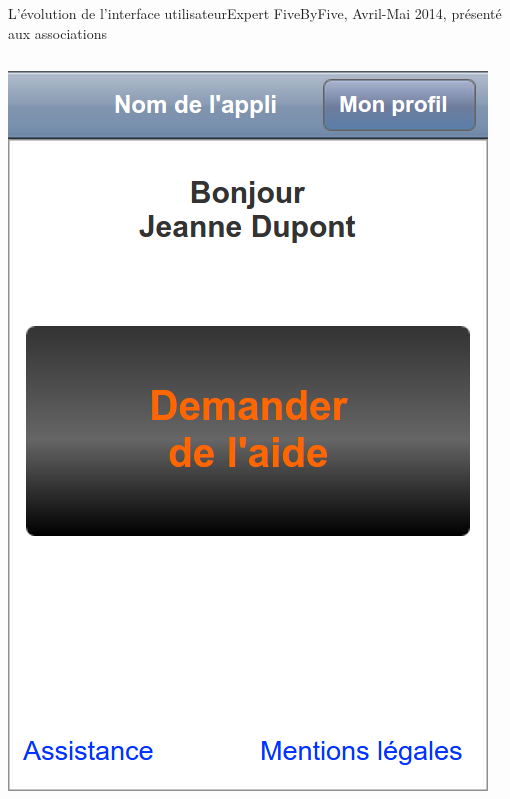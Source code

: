\documentclass{beamer}
\begin{document}
\begin{frame}{L'évolution de l'interface utilisateur}{Expert FiveByFive, Avril-Mai 2014, présenté aux associations}
    \begin{columns}
        \begin{column}{0.45\textwidth}
            \includegraphics[width=\textwidth]{judith-03/01-home.png}
        \end{column}
        \begin{column}{0.45\textwidth}

\end{column}
\end{columns}
\end{frame}
\end{document}
